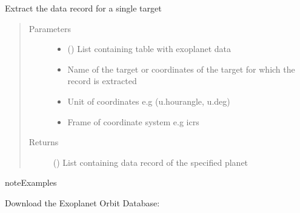 \documentclass[a4paper,10pt,english]{sphinxmanual}
\begin{document}

\begin{fulllineitems}
\label{\detokenize{cascade.exoplanet_tools:cascade.exoplanet_tools.exoplanet_tools.extract_exoplanet_data}}
Extract the data record for a single target
\begin{quote}\begin{description}
\item[{Parameters}] \leavevmode\begin{itemize}
\item {} 
 () \textendash{} List containing table with exoplanet data

\item {} 
 \textendash{} Name of the target or coordinates of the target for
which the record is extracted

\item {} 
 \textendash{} Unit of coordinates e.g (u.hourangle, u.deg)

\item {} 
 \textendash{} Frame of coordinate system e.g icrs

\end{itemize}

\item[{Returns}] \leavevmode
{} () \textendash{} List containing data record of the specified planet

\end{description}\end{quote}

\begin{sphinxadmonition}{note}{Examples}

Download the Exoplanet Orbit Database:

%
\begin{sphinxVerbatim}[commandchars=\\\{\}]
 
  
\end{sphinxVerbatim}


\end{sphinxadmonition}
\end{fulllineitems}
\end{document}
